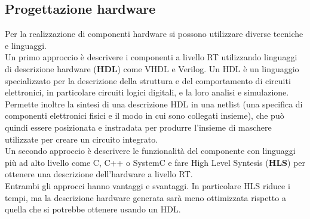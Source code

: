 \documentclass[]{IEEEtran}
\begin{document}
\subsection{Progettazione hardware}
Per la realizzazione di componenti hardware si possono utilizzare diverse tecniche e linguaggi.
\\Un primo approccio è descrivere i componenti a livello RT utilizzando linguaggi di descrizione hardware (\textbf{HDL}) come VHDL e Verilog. Un HDL è un linguaggio specializzato per la descrizione della struttura e del comportamento di circuiti elettronici, in particolare circuiti logici digitali, e la loro analisi e simulazione. Permette inoltre la sintesi di una descrizione HDL in una netlist (una specifica di componenti elettronici fisici e il modo in cui sono collegati insieme), che può quindi essere posizionata e instradata per produrre l'insieme di maschere utilizzate per creare un circuito integrato\cite{HDL}.
\\Un secondo approccio è descrivere le funzionalità del componente con linguaggi più ad alto livello come C, C++ o SystemC\cite{SystemC} e fare High Level Syntesis (\textbf{HLS}) per ottenere una descrizione dell'hardware a livello RT\cite{HLS}.
\\Entrambi gli approcci hanno vantaggi e svantaggi. In particolare HLS riduce i tempi, ma la descrizione hardware generata sarà meno ottimizzata rispetto a quella che si potrebbe ottenere usando un HDL.
\end{document}
